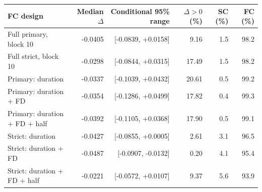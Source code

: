 \begin{tabular}{lrrrrr}
\toprule
FC design & Median $\Delta$ & Conditional 95\% range & $\Delta>0$ (\%) & SC (\%) & FC (\%) \\
\midrule
Full primary, block 10 & -0.0405 & [-0.0839, +0.0158] & 9.16 & 1.5 & 98.2 \\
Full strict, block 10 & -0.0298 & [-0.0844, +0.0315] & 17.49 & 1.5 & 98.2 \\
Primary: duration & -0.0337 & [-0.1039, +0.0432] & 20.61 & 0.5 & 99.2 \\
Primary: duration + FD & -0.0354 & [-0.1286, +0.0499] & 17.82 & 0.4 & 99.3 \\
Primary: duration + FD + half & -0.0392 & [-0.1105, +0.0368] & 17.90 & 0.5 & 99.1 \\
Strict: duration & -0.0427 & [-0.0855, +0.0005] & 2.61 & 3.1 & 96.5 \\
Strict: duration + FD & -0.0487 & [-0.0907, -0.0132] & 0.20 & 4.1 & 95.4 \\
Strict: duration + FD + half & -0.0221 & [-0.0572, +0.0107] & 9.37 & 5.6 & 93.9 \\
\bottomrule
\end{tabular}
